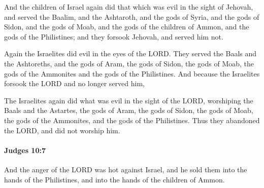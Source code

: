 			\begin{versebox}
					\item[BHS] 
					\item[ASV] And the children of Israel again did that which was evil in the sight of Jehovah, and served the Baalim, and the Ashtaroth, and the gods of Syria, and the gods of Sidon, and the gods of Moab, and the gods of the children of Ammon, and the gods of the Philistines; and they forsook Jehovah, and served him not.
					\item[NIV] Again the Israelites did evil in the eyes of the LORD. They served the Baals and the Ashtoreths, and the gods of Aram, the gods of Sidon, the gods of Moab, the gods of the Ammonites and the gods of the Philistines. And because the Israelites forsook the LORD and no longer served him,
					\item[NRSV] The Israelites again did what was evil in the sight of the LORD, worshiping the Baals and the Astartes, the gods of Aram, the gods of Sidon, the gods of Moab, the gods of the Ammonites, and the gods of the Philistines. Thus they abandoned the LORD, and did not worship him.
			\end{versebox}

		\paragraph{Judges 10:7} %
			\label{JUDGES-10-7}

			And the anger of the LORD was hot against Israel, and he sold them into the hands of the Philistines, and into the hands of the children of Ammon.

